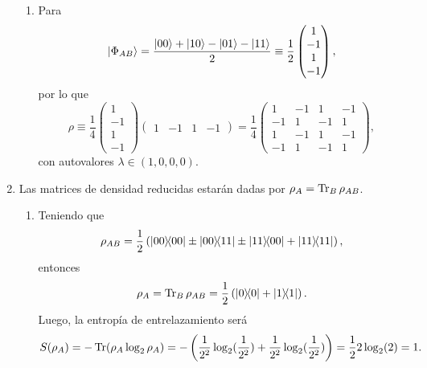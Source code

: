 \documentclass{scrartcl}
\newcommand{\inv}[1]{\frac{1}{#1}}
\DeclareRobustCommand{\[}{\begin{equation}}
\DeclareRobustCommand{\]}{\end{equation}}
\begin{document}
\begin{enumerate}
\begin{enumerate}
        
        \item Para
        \[
            \ket{\Phi_{AB}} = \frac{\ket{00} + \ket{10} - \ket{01} - \ket{11}}{2} \equiv \inv{2}
            \begin{pmatrix}
                1 \\ -1 \\ 1 \\ -1
            \end{pmatrix},
        \]
        por lo que
        \[
            \rho \equiv \inv{4}
            \begin{pmatrix}
                1 \\ -1 \\ 1 \\ -1
            \end{pmatrix}
            \begin{pmatrix}
                1 & -1 & 1 & -1
            \end{pmatrix}
            =
            \inv{4}
            \begin{pmatrix}
                1 & -1 & 1 & -1 \\
                -1 & 1 & -1 & 1 \\
                1 & -1 & 1 & -1 \\
                -1 & 1 & -1 & 1
            \end{pmatrix},
        \]
        con autovalores $\lambda \in (1, 0, 0, 0)$.
    \end{enumerate}
    
    
    
    \item Las matrices de densidad reducidas estarán dadas por $\rho_A = \Tr_B{\rho_{AB}}$.
    \begin{enumerate}
        \item Teniendo que
        \[ \rho_{AB} = \inv{2} \left( \dyad{00}{00} \pm \dyad{00}{11} \pm \dyad{11}{00} + \dyad{11}{11} \right), \]
        entonces
        \[ \rho_A = \Tr_B{\rho_{AB}} = \inv{2} \left( \dyad{0}{0} + \dyad{1}{1} \right). \]
        Luego, la entropía de entrelazamiento será
        \[ S(\rho_A) = -\Tr(\rho_A \log_2 \rho_A) = - \left( \inv{2^2} \log_2(\inv{2^2}) + \inv{2^2} \log_2(\inv{2^2}) \right) = \inv{2} 2 \log_2(2) = 1. \]
        

\end{enumerate}
\end{enumerate}
\end{document}
